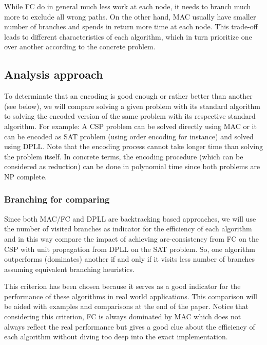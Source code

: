 While FC do in general much less work at each node, it needs to branch much more to exclude all wrong paths. On the other hand, MAC usually have smaller number of branches and spends in return more time at each node. This trade-off leads to different characteristics of each algorithm, which in turn prioritize one over another according to the concrete problem.

\subsection{Analysis approach}
To determinate that an encoding is good enough or rather better than another (see below), we will compare solving a given problem with its standard algorithm to solving the encoded version of the same problem with its respective standard algorithm. For example: A CSP problem can be solved directly using MAC or it can be encoded as SAT problem (using order encoding for instance) and solved using DPLL. Note that the encoding process cannot take longer time than solving the problem itself. In concrete terms, the encoding procedure (which can be considered as reduction) can be done in polynomial time since both problems are NP complete.

\subsubsection{Branching for comparing}
Since both MAC/FC and DPLL are backtracking based approaches, we will use the number of visited branches as indicator for the efficiency of each algorithm and in this way compare the impact of achieving arc-consistency from FC on the CSP with unit propagation from DPLL on the SAT problem. So, one algorithm outperforms (dominates) another if and only if it visits less number of branches assuming equivalent branching heuristics.

This criterion has been chosen because it serves as a good indicator for the performance of these algorithms in real world applications. This comparison will be aided with examples and comparisons at the end of the paper.
Notice that considering this criterion, FC is always dominated by MAC which does not always reflect the real performance but gives a good clue about the efficiency of each algorithm without diving too deep into the exact implementation.
